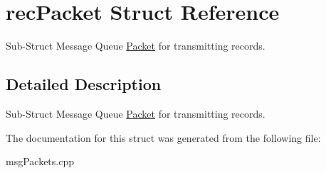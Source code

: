 \hypertarget{structrecPacket}{\section{rec\-Packet Struct Reference}
\label{structrecPacket}
}


Sub-\/\-Struct Message Queue \hyperlink{structPacket}{Packet} for transmitting records.  




\subsection{Detailed Description}
Sub-\/\-Struct Message Queue \hyperlink{structPacket}{Packet} for transmitting records. 

The documentation for this struct was generated from the following file\-:\begin{DoxyCompactItemize}
\item 
msg\-Packets.\-cpp\end{DoxyCompactItemize}
